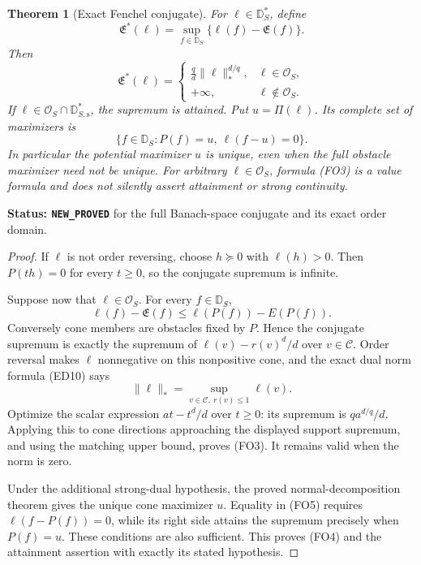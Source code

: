 \documentclass[11pt,a4paper]{article}
\numberwithin{equation}{section}
\newtheorem{theorem}{Theorem}[section]
\theoremstyle{definition}
\theoremstyle{remark}
\begin{document}
\begin{theorem}[Exact Fenchel conjugate]
\label{thm:r12-obstacle-Fenchel-conjugate}
For $\ell\in\mathbb D_S^*$, define
\[
 \mathfrak E^*(\ell)=
       \sup_{f\in\mathbb D_S}\{\ell(f)-\mathfrak E(f)\}.
\]
Then
\[
 \boxed{\quad
 \mathfrak E^*(\ell)=
 \begin{cases}
 \displaystyle\frac qd\|\ell\|_*^{d/q},&\ell\in\mathscr O_S,\\
 +\infty,&\ell\notin\mathscr O_S.
 \end{cases}\quad}
 \tag{FO3}
\]
If $\ell\in\mathscr O_S\cap\mathbb D_{S,\mathrm s}^*$,
the supremum is attained.  Put $u=\Pi(\ell)$.  Its complete
set of maximizers is
\[
 \{f\in\mathbb D_S:P(f)=u,\ \ell(f-u)=0\}.
 \tag{FO4}
\]
In particular the potential maximizer $u$ is unique, even
when the full obstacle maximizer need not be unique.
For arbitrary $\ell\in\mathscr O_S$, formula
\textup{(FO3)} is a value formula and does not silently
assert attainment or strong continuity.
\end{theorem}

\noindent\textbf{Status: \texttt{NEW\_PROVED}} for the
full Banach-space conjugate and its exact order domain.

\begin{proof}
If $\ell$ is not order reversing, choose $h\succeq0$
with $\ell(h)>0$.  Then $P(th)=0$ for every $t\ge0$,
so the conjugate supremum is infinite.

Suppose now that $\ell\in\mathscr O_S$.  For every
$f\in\mathbb D_S$,
\[
 \ell(f)-\mathfrak E(f)
       \le\ell(P(f))-E(P(f)).
 \tag{FO5}
\]
Conversely cone members are obstacles fixed by $P$.  Hence
the conjugate supremum is exactly the supremum of
$\ell(v)-r(v)^d/d$ over $v\in\mathscr C$.
Order reversal makes $\ell$ nonnegative on this nonpositive
cone, and the exact dual norm formula \textup{(ED10)} says
\[
 \|\ell\|_*=
          \sup_{v\in\mathscr C,\ r(v)\le1}\ell(v).
\]
Optimize the scalar expression $at-t^d/d$ over $t\ge0$:
its supremum is $q a^{d/q}/d$.  Applying this to cone
directions approaching the displayed support supremum,
and using the matching upper bound, proves \textup{(FO3)}.
It remains valid when the norm is zero.

Under the additional strong-dual hypothesis, the proved
normal-decomposition theorem gives the unique cone
maximizer $u$.  Equality in \textup{(FO5)} requires
$\ell(f-P(f))=0$, while its right side attains the
supremum precisely when $P(f)=u$.  These conditions are
also sufficient.  This proves \textup{(FO4)} and the
attainment assertion with exactly its stated hypothesis.
\end{proof}
\end{document}
